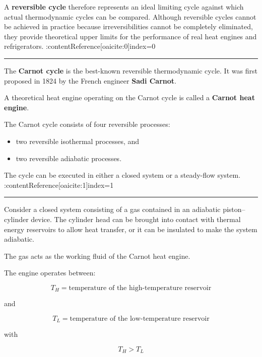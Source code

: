 \documentclass[12pt]{article}
\newcommand{\mysubsection}[2]{%
    \vspace{5px}
    \noindent{\headingfont\large #1\space #2\par}
    \vspace{4pt}
    \hrule
    \vspace{15pt}
}
\begin{document}
A \textbf{reversible cycle} therefore represents an ideal limiting cycle against which actual thermodynamic cycles can be compared. Although reversible cycles cannot be achieved in practice because irreversibilities cannot be completely eliminated, they provide theoretical upper limits for the performance of real heat engines and refrigerators. :contentReference[oaicite:0]{index=0}

\mysubsection{}{Carnot Cycle}

The \textbf{Carnot cycle} is the best-known reversible thermodynamic cycle. It was first proposed in 1824 by the French engineer \textbf{Sadi Carnot}.

A theoretical heat engine operating on the Carnot cycle is called a \textbf{Carnot heat engine}.

The Carnot cycle consists of four reversible processes:

\begin{itemize}
    \item two reversible isothermal processes, and
    \item two reversible adiabatic processes.
\end{itemize}

The cycle can be executed in either a closed system or a steady-flow system. :contentReference[oaicite:1]{index=1}

\mysubsection{}{Carnot Heat Engine}

Consider a closed system consisting of a gas contained in an adiabatic piston--cylinder device. The cylinder head can be brought into contact with thermal energy reservoirs to allow heat transfer, or it can be insulated to make the system adiabatic.

The gas acts as the working fluid of the Carnot heat engine.

The engine operates between:

\begin{equation*}
T_H = \text{temperature of the high-temperature reservoir}
\end{equation*}

and

\begin{equation*}
T_L = \text{temperature of the low-temperature reservoir}
\end{equation*}

with

\begin{equation*}
T_H > T_L
\end{equation*}
\end{document}
